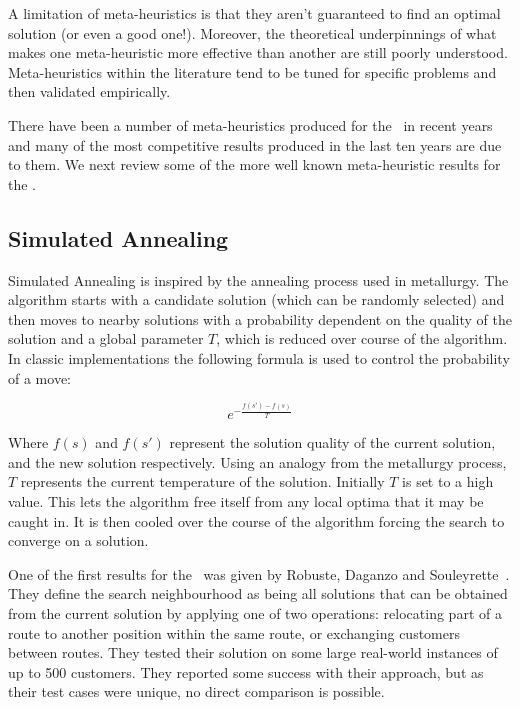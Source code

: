 
A limitation of meta-heuristics is that they aren't guaranteed to find an optimal solution (or even a good one!). Moreover, the theoretical underpinnings of what makes one meta-heuristic more effective than another are still poorly understood. Meta-heuristics within the literature tend to be tuned for specific problems and then validated empirically.

There have been a number of meta-heuristics produced for the \VRP\ in recent years and many of the most competitive results produced in the last ten years are due to them. We next review some of the more well known meta-heuristic results for the \VRP.

\subsection{Simulated Annealing}

Simulated Annealing is inspired by the annealing process used in metallurgy. The algorithm starts with a candidate solution (which can be randomly selected) and then moves to nearby solutions with a probability dependent on the quality of the solution and a global parameter $T$, which is reduced over course of the algorithm. In classic implementations the following formula is used to control the probability of a move: 

\[
e^{-\frac{f(s')-f(s)}{T}}
\]

Where $f(s)$ and $f(s')$ represent the solution quality of the current solution, and the new solution respectively. Using an analogy from the metallurgy process, $T$ represents the current temperature of the solution. Initially $T$ is set to a high value. This lets the algorithm free itself from any local optima that it may be caught in. It is then cooled over the course of the algorithm forcing the search to converge on a solution. 

One of the first results for the \VRP\ was given by Robuste, Daganzo and Souleyrette~\cite{RDS:1990}. They define the search neighbourhood as being all solutions that can be obtained from the current solution by applying one of two operations: relocating part of a route to another position within the same route, or exchanging customers between routes. They tested their solution on some large real-world instances of up to 500 customers. They reported some success with their approach, but as their test cases were unique, no direct comparison is possible. 

